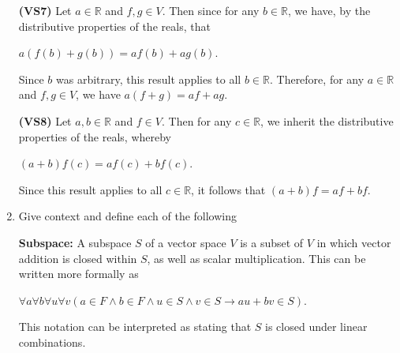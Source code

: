 \documentclass[12pt, a4paper]{article}
\begin{document}
\begin{enumerate}
    \textbf{(VS7) }Let $a\in\mathbb{R}$ and $f,g\in V$. Then since for any $b\in\mathbb{R}$, we have, by the distributive properties of the reals, that\par
    
    \vspace{2mm}
    
    \centerline{$a(f(b)+g(b))=a f(b)+a g(b)$.}
    
    \vspace{2mm}
    
    Since $b$ was arbitrary, this result applies to all $b\in\mathbb{R}$. Therefore, for any $a\in\mathbb{R}$ and $f,g\in V$, we have $a(f+g)=a f+a g$.
    
    \vspace{4mm}
    
    \textbf{(VS8) }Let $a,b\in\mathbb{R}$ and $f\in V$. Then for any $c\in\mathbb{R}$, we inherit the distributive properties of the reals, whereby\par
    
    \vspace{2mm}
    
    \centerline{$(a+b)f(c)=a f(c)+b f(c)$.}
    
    \vspace{2mm}
    
    Since this result applies to all $c\in\mathbb{R}$, it follows that $(a+b)f=a f+b f$.
    
    \vspace{4mm}
    
    \item Give context and define each of the following\par
    
    \vspace{4mm}
    
    \textbf{Subspace: }A subspace $S$ of a vector space $V$ is a subset of $V$ in which vector addition is closed within $S$, as well as scalar multiplication. This can be written more formally as\par
    
    \vspace{2mm}
    
    \centerline{$\forall a\forall b\forall u\forall v(a\in F\wedge b\in F\wedge u\in S\wedge v\in S\rightarrow au+bv\in S)$.}
    
    \vspace{2mm}
    
    This notation can be interpreted as stating that $S$ is closed under linear combinations.\par
    

\end{enumerate}
\end{document}
